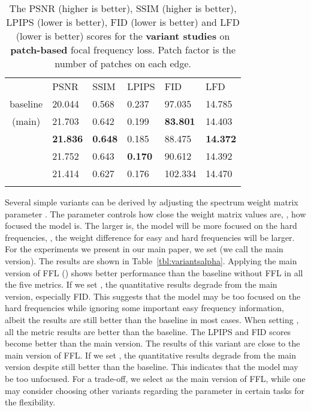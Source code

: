 \documentclass[10pt,twocolumn,letterpaper]{article}
\begin{document}
\begin{table}[tb!]
\centering
\footnotesize
\caption{The PSNR (higher is better), SSIM (higher is better), LPIPS (lower is better), FID (lower is better) and LFD (lower is better) scores for the \textbf{variant studies} on \textbf{patch-based} focal frequency loss. Patch factor  is the number of patches on each edge.}
\begin{tabularx}{\linewidth}{c|*{5}{|Y}}
\Xhline{1pt}
 & PSNR& SSIM& LPIPS& FID& LFD \\
\Xhline{0.6pt}
baseline & 20.044& 0.568& 0.237& 97.035& 14.785 \\
\Xhline{0.4pt}
 (main) & 21.703& 0.642& 0.199& {\bf83.801}& 14.403 \\
 & {\bf21.836}& {\bf0.648}& 0.185& 88.475& {\bf14.372} \\
 & 21.752& 0.643& {\bf0.170}& 90.612& 14.392 \\
 & 21.414& 0.627& 0.176& 102.334& 14.470 \\
\Xhline{1pt}
\end{tabularx}
\label{tbl:variantspatch}
\vspace{-0.2cm}
\end{table}


Several simple variants can be derived by adjusting the spectrum weight matrix parameter . The parameter  controls how close the weight matrix values are, \ie, how focused the model is. The larger  is, the model will be more focused on the hard frequencies, \ie, the weight difference for easy and hard frequencies will be larger. For the experiments we present in our main paper, we set  (we call the main version).
The results are shown in Table~\ref{tbl:variantsalpha}.
Applying the main version of FFL () shows better performance than the baseline without FFL in all the five metrics.
If we set , the quantitative results degrade from the main version, especially FID. This suggests that the model may be too focused on the hard frequencies while ignoring some important easy frequency information, albeit the results are still better than the baseline in most cases.
When setting , all the metric results are better than the baseline. The LPIPS and FID scores become better than the main version. The results of this variant are close to the main version of FFL.
If we set , the quantitative results degrade from the main version despite still better than the baseline. This indicates that the model may be too unfocused.
For a trade-off, we select  as the main version of FFL, while one may consider choosing other variants regarding the parameter  in certain tasks for the flexibility.
\end{document}
